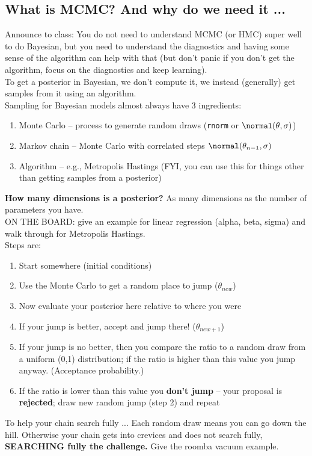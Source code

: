 \documentclass[11pt]{article}
\begin{document}
\subsection{What is MCMC? And why do we need it ...}

{\Large Announce to class:} You do not need to understand MCMC (or HMC) super well to do Bayesian, but you need to understand the diagnostics and having some sense of the algorithm can help with that (but don't panic if you don't get the algorithm, focus on the diagnostics and keep learning). \\

To get a posterior in Bayesian, we don't compute it, we instead (generally) get samples from it using an algorithm. \\
Sampling for Bayesian models almost always have 3 ingredients:

\begin{enumerate}
\item Monte Carlo -- process to generate random draws (\verb|rnorm| or $\normal(\theta, \sigma)$)
\item Markov chain -- Monte Carlo with correlated steps $\normal(\theta_{n-1}, \sigma)$
\item Algorithm -- e.g., Metropolis Hastings (FYI, you can use this for things other than getting samples from a posterior)
\end{enumerate}

{\bf How many dimensions is a posterior?} As many dimensions as the number of parameters you have. \\

ON THE BOARD: give an example for linear regression (alpha, beta, sigma) and walk through for Metropolis Hastings. \\
Steps are: 

\begin{enumerate}
\item Start somewhere (initial conditions)
\item Use the Monte Carlo to get a random place to jump ($\theta_{new}$)
\item Now evaluate your posterior here relative to where you were
\item If your jump is better, accept and jump there! ($\theta_{new+1}$)
\item If your jump is no better, then you compare the ratio to a random draw from a uniform (0,1) distribution; if the ratio is higher than this value you jump anyway. (Acceptance probability.)
\item If the ratio is lower than this value you {\bf don't jump} -- your proposal is {\bf rejected}; draw new random jump (step 2) and repeat
\end{enumerate}
 To help your chain search fully ... Each random draw means you can go down the hill. Otherwise your chain gets into crevices and does not search fully, {\bf SEARCHING fully the challenge.} Give the roomba vacuum example. 
\end{document}
